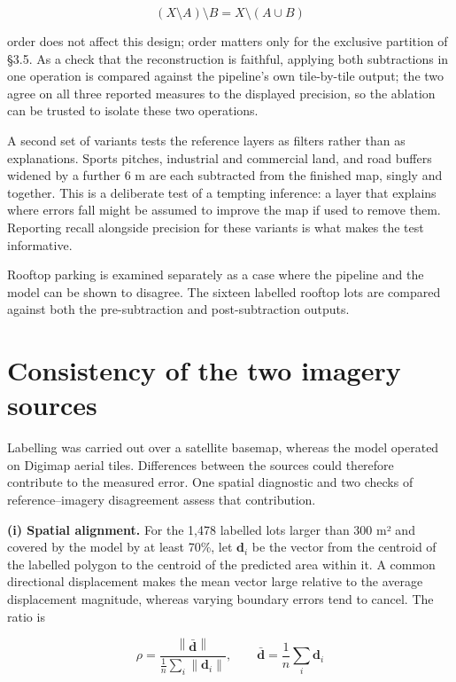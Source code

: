 \[
(X \setminus A) \setminus B = X \setminus (A \cup B)
\]

order does not affect this design; order matters only for the exclusive partition of §3.5. As a check that the reconstruction is faithful, applying both subtractions in one operation is compared against the pipeline's own tile-by-tile output; the two agree on all three reported measures to the displayed precision, so the ablation can be trusted to isolate these two operations.

A second set of variants tests the reference layers as filters rather than as explanations. Sports pitches, industrial and commercial land, and road buffers widened by a further 6 m are each subtracted from the finished map, singly and together. This is a deliberate test of a tempting inference: a layer that explains where errors fall might be assumed to improve the map if used to remove them. Reporting recall alongside precision for these variants is what makes the test informative.

Rooftop parking is examined separately as a case where the pipeline and the model can be shown to disagree. The sixteen labelled rooftop lots are compared against both the pre-subtraction and post-subtraction outputs.

\hypertarget{consistency-of-the-two-imagery-sources}{%
\section{Consistency of the two imagery sources}\label{consistency-of-the-two-imagery-sources}}

Labelling was carried out over a satellite basemap, whereas the model operated on Digimap aerial tiles. Differences between the sources could therefore contribute to the measured error. One spatial diagnostic and two checks of reference--imagery disagreement assess that contribution.

\textbf{(i) Spatial alignment.} For the 1,478 labelled lots larger than 300 m² and covered by the model by at least 70\%, let \(\mathbf{d}_i\) be the vector from the centroid of the labelled polygon to the centroid of the predicted area within it. A common directional displacement makes the mean vector large relative to the average displacement magnitude, whereas varying boundary errors tend to cancel. The ratio is

\[
\rho = \frac{\left\lVert \bar{\mathbf{d}} \right\rVert}{\frac{1}{n}\sum_i \lVert \mathbf{d}_i \rVert},
\qquad \bar{\mathbf{d}} = \frac{1}{n}\sum_i \mathbf{d}_i
\]

